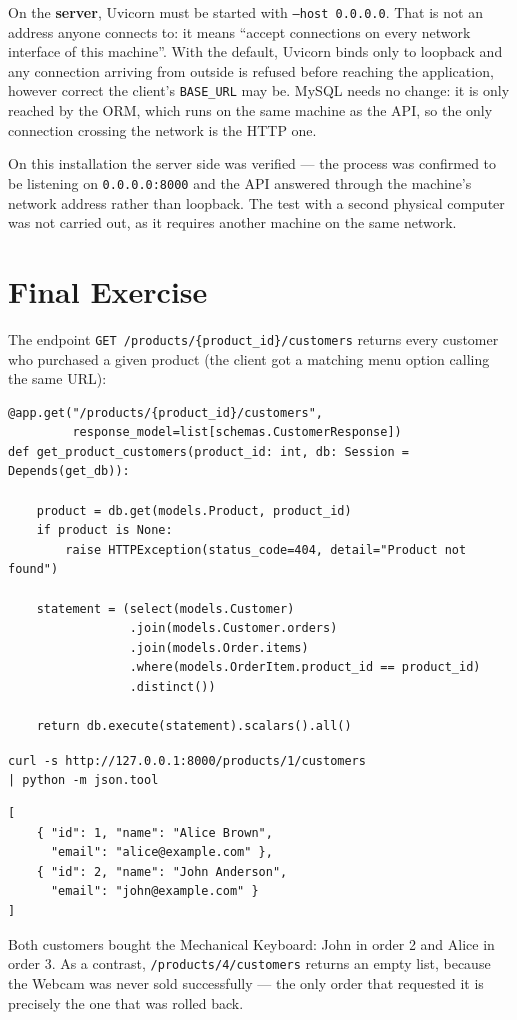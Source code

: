 \documentclass[10pt,a4paper]{article}
\begin{document}
On the \textbf{server}, Uvicorn must be started with \texttt{--host 0.0.0.0}.
That is not an address anyone connects to: it means ``accept connections on
every network interface of this machine''. With the default, Uvicorn binds only
to loopback and any connection arriving from outside is refused before reaching
the application, however correct the client's \texttt{BASE\_URL} may be. MySQL
needs no change: it is only reached by the ORM, which runs on the same machine
as the API, so the only connection crossing the network is the HTTP one.

On this installation the server side was verified --- the process was confirmed
to be listening on \texttt{0.0.0.0:8000} and the API answered through the
machine's network address rather than loopback. The test with a second physical
computer was not carried out, as it requires another machine on the same
network.

\section{Final Exercise}

The endpoint \texttt{GET /products/\{product\_id\}/customers} returns every
customer who purchased a given product (the client got a matching menu option
calling the same URL):

\begin{lstlisting}[style=py]
@app.get("/products/{product_id}/customers",
         response_model=list[schemas.CustomerResponse])
def get_product_customers(product_id: int, db: Session = Depends(get_db)):

    product = db.get(models.Product, product_id)
    if product is None:
        raise HTTPException(status_code=404, detail="Product not found")

    statement = (select(models.Customer)
                 .join(models.Customer.orders)
                 .join(models.Order.items)
                 .where(models.OrderItem.product_id == product_id)
                 .distinct())

    return db.execute(statement).scalars().all()
\end{lstlisting}

\noindent
\begin{minipage}[t]{0.46\textwidth}
\footnotesize\texttt{curl -s http://127.0.0.1:8000/products/1/customers\\
| python -m json.tool}\normalsize
\begin{lstlisting}[style=plain]
[
    { "id": 1, "name": "Alice Brown",
      "email": "alice@example.com" },
    { "id": 2, "name": "John Anderson",
      "email": "john@example.com" }
]
\end{lstlisting}
\end{minipage}\hfill
\begin{minipage}[t]{0.51\textwidth}
\vspace{0.1cm}
\footnotesize
Both customers bought the Mechanical Keyboard: John in order 2 and Alice in
order 3. As a contrast, \texttt{/products/4/customers} returns an empty list,
because the Webcam was never sold successfully --- the only order that requested
it is precisely the one that was rolled back.
\normalsize
\end{minipage}
\end{document}
